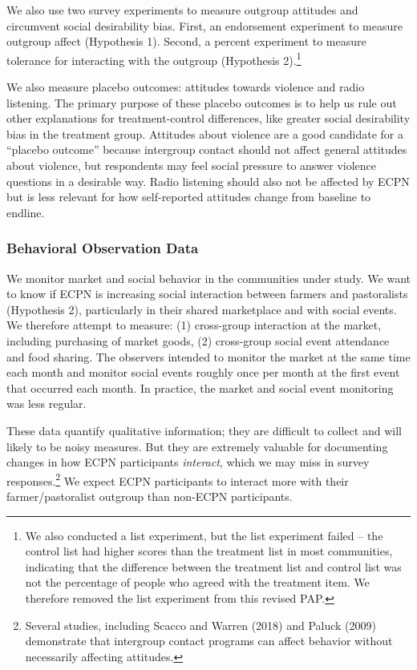 \documentclass[
]{article}
\begin{document}
We also use two survey experiments to measure outgroup attitudes and
circumvent social desirability bias. First, an endorsement experiment to
measure outgroup affect (Hypothesis 1). Second, a percent experiment to
measure tolerance for interacting with the outgroup (Hypothesis
2).\footnote{We also conducted a list experiment, but the list
  experiment failed -- the control list had higher scores than the
  treatment list in most communities, indicating that the difference
  between the treatment list and control list was not the percentage of
  people who agreed with the treatment item. We therefore removed the
  list experiment from this revised PAP.}

We also measure placebo outcomes: attitudes towards violence and radio
listening. The primary purpose of these placebo outcomes is to help us
rule out other explanations for treatment-control differences, like
greater social desirability bias in the treatment group. Attitudes about
violence are a good candidate for a ``placebo outcome'' because
intergroup contact should not affect general attitudes about violence,
but respondents may feel social pressure to answer violence questions in
a desirable way. Radio listening should also not be affected by ECPN but
is less relevant for how self-reported attitudes change from baseline to
endline.

\hypertarget{behavioral-observation-data}{%
\subsubsection{Behavioral Observation
Data}\label{behavioral-observation-data}}

We monitor market and social behavior in the communities under study. We
want to know if ECPN is increasing social interaction between farmers
and pastoralists (Hypothesis 2), particularly in their shared
marketplace and with social events. We therefore attempt to measure: (1)
cross-group interaction at the market, including purchasing of market
goods, (2) cross-group social event attendance and food sharing. The
observers intended to monitor the market at the same time each month and
monitor social events roughly once per month at the first event that
occurred each month. In practice, the market and social event monitoring
was less regular.

These data quantify qualitative information; they are difficult to
collect and will likely to be noisy measures. But they are extremely
valuable for documenting changes in how ECPN participants
\emph{interact}, which we may miss in survey responses.\footnote{Several
  studies, including Scacco and Warren (2018) and Paluck (2009)
  demonstrate that intergroup contact programs can affect behavior
  without necessarily affecting attitudes.} We expect ECPN participants
to interact more with their farmer/pastoralist outgroup than non-ECPN
participants.
\end{document}
